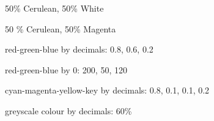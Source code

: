 \documentclass[a4paper, 12pt]{article}
\begin{document}
\textcolor{Cerulean!50}{50\% Cerulean, 50\% White}

\textcolor{Cerulean!50!Magenta}{50 \% Cerulean, 50\% Magenta}

\textcolor{rgb_colour1}{red-green-blue by decimals: 0.8, 0.6, 0.2}

\textcolor{rgb_colour2}{red-green-blue by 0: 200, 50, 120}

\textcolor{cmyk_colour}{cyan-magenta-yellow-key by decimals: 0.8, 0.1, 0.1, 0.2}

\textcolor{greyscale}{greyscale colour by decimals: 60\%}
\end{document}
